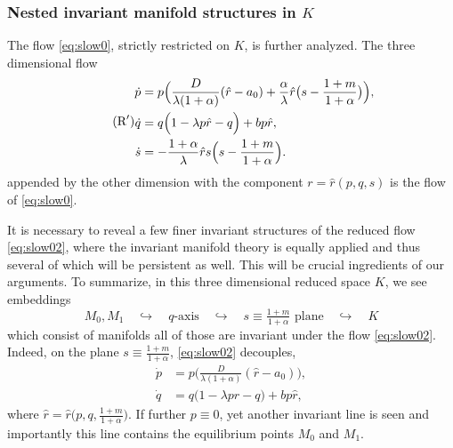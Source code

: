\documentclass[a4paper,11pt]{article}
\theoremstyle{remark}
\begin{document}
\subsubsection{Nested invariant manifold structures in $K$}
The flow \eqref{eq:slow0}, strictly restricted on $K$, is further analyzed. The three dimensional flow
\begin{equation}\label{eq:slow02} \tag{$\text{R}^\prime$}
 \begin{aligned}
 \dot{p} &= p\Big(\frac{D}{\lambda(1+\alpha)}(\hat{r}-a_0) + \frac{\alpha}{\lambda}\hat{r}\big(s- \frac{1+m}{1+\alpha}\big) \Big),\\
 \dot{q} &=q\Big(1 -\lambda p \hat{r} -q\Big) + b p \hat{r},\\%
 \dot{s} &= -\frac{1+\alpha}{\lambda}\hat{r}s\Big(s- \frac{1+m}{1+\alpha}\Big).
 \end{aligned}
\end{equation}
appended by the other dimension with the component $r=\hat{r}(p,q,s)$ is the flow of \eqref{eq:slow0}. 

It is necessary to reveal a few finer invariant structures of the reduced flow \eqref{eq:slow02}, where the invariant manifold theory is equally applied and thus several of which will be persistent as well. This will be crucial ingredients of our arguments. To summarize, in this three dimensional reduced space $K$, we see embeddings 
$$ M_0, M_1 \quad \hookrightarrow \quad \text{$q$-axis} \quad \hookrightarrow \quad \text{$s\equiv\tfrac{1+m}{1+\alpha}$ plane} \quad \hookrightarrow \quad K$$
which consist of manifolds all of those are invariant under the flow \eqref{eq:slow02}. Indeed, on the plane $s\equiv\tfrac{1+m}{1+\alpha}$, \eqref{eq:slow02} decouples,
\begin{equation}\label{eq:slow03}
 \begin{aligned}
 \dot{p} &= p\Big(\frac{D}{\lambda(1+\alpha)}(\hat{r}-a_0)\Big),\\
 \dot{q} &= q\Big(1 -\lambda p \hat{r} -q\Big) + b p \hat{r}, 
 \end{aligned}
\end{equation}
where $\hat{r}=\hat{r}\big(p,q,\frac{1+m}{1+\alpha}\big)$. If further $p\equiv0$, yet another invariant line is seen and importantly this line contains the equilibrium points $M_0$ and $M_1$.
\end{document}
